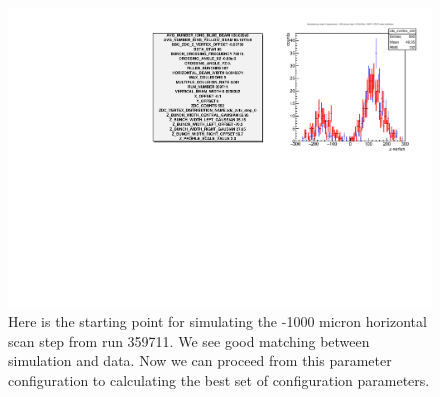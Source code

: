 \begin{figure}
\begin{center}
\includegraphics[width=\linewidth,height=\textheight,keepaspectratio]{../HourglassCorrection/figs/359711_step0_config_compare}
\caption{ 
Here is the starting point for simulating the -1000 micron horizontal scan step
from run 359711. We see good matching between simulation and data. Now we can
proceed from this parameter configuration to calculating the best set of
configuration parameters.
}
\label{fig:359711_step0_config_compare}
\end{center}
\end{figure}

